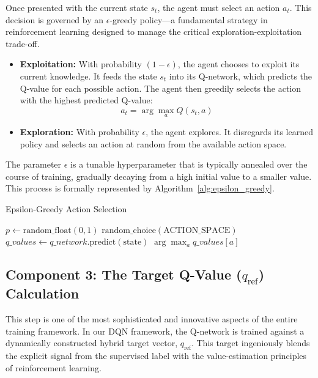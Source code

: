 \documentclass[12pt]{report}
\begin{document}
Once presented with the current state $s_t$, the agent must select an action $a_t$. This decision is governed by an $\epsilon$-greedy policy—a fundamental strategy in reinforcement learning designed to manage the critical exploration-exploitation trade-off.

\begin{itemize}
    \item \textbf{Exploitation:} With probability $(1 - \epsilon)$, the agent chooses to exploit its current knowledge. It feeds the state $s_t$ into its Q-network, which predicts the Q-value for each possible action. The agent then greedily selects the action with the highest predicted Q-value: 
    \[
    a_t = \arg\max_a Q(s_t, a)
    \]
    
    \item \textbf{Exploration:} With probability $\epsilon$, the agent explores. It disregards its learned policy and selects an action at random from the available action space.
\end{itemize}

The parameter $\epsilon$ is a tunable hyperparameter that is typically annealed over the course of training, gradually decaying from a high initial value to a smaller value. This process is formally represented by Algorithm~\ref{alg:epsilon_greedy}.

\begin{algorithm}[H]
\caption{Epsilon-Greedy Action Selection}
\label{alg:epsilon_greedy}
\begin{algorithmic}[1]
    \State $p \gets \text{random\_float}(0, 1)$
        \State \Return $\text{random\_choice}(\text{ACTION\_SPACE})$
    \Else
        \State $q\_values \gets q\_network.\text{predict}(\text{state})$
        \State \Return $\arg\max_a q\_values[a]$
    \EndIf
\EndFunction
\end{algorithmic}
\end{algorithm}

\subsection{Component 3: The Target Q-Value ($q_\text{ref}$) Calculation}

This step is one of the most sophisticated and innovative aspects of the entire training framework. In our DQN framework, the Q-network is trained against a dynamically constructed hybrid target vector, $q_\text{ref}$. This target ingeniously blends the explicit signal from the supervised label with the value-estimation principles of reinforcement learning.
\end{document}
